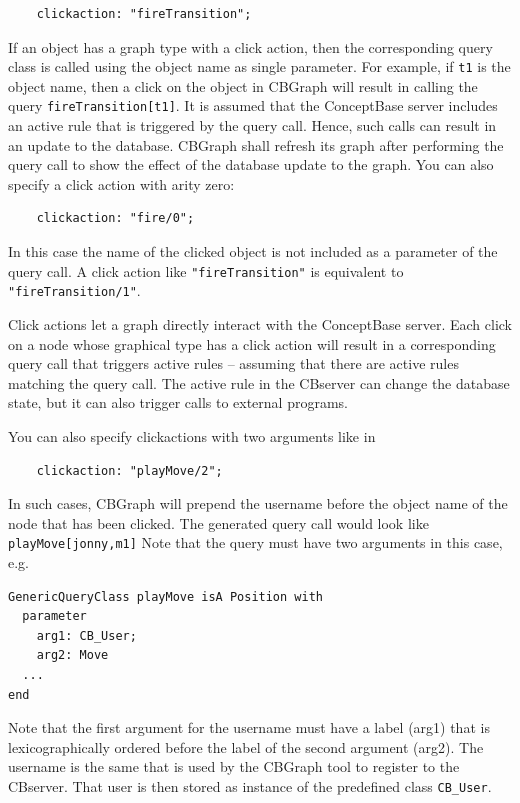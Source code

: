 {\small
\begin{verbatim}
    clickaction: "fireTransition";
\end{verbatim}
}

If an object has a graph type with a click action, then the corresponding query class
is called using the object name as single parameter. For example, if {\tt t1} is the
object name, then a click on the object in CBGraph will result in calling the query
{\tt fireTransition[t1]}. It is assumed that the ConceptBase server includes an
active rule that is triggered by the query call. Hence, such calls can result in an
update to the database.
CBGraph shall refresh its graph after performing the query call to show the effect
of the database update to the graph.
You can also specify a click action with arity zero:

{\small
\begin{verbatim}
    clickaction: "fire/0";
\end{verbatim}
}
In this case the name of the clicked object is not included as a parameter of the query call.
A click action like {\tt "fireTransition"} is equivalent to {\tt "fireTransition/1"}.

Click actions let a graph directly interact with the ConceptBase server. Each click
on a node whose graphical type has a click action will result in a corresponding query
call that triggers active rules -- assuming that there are active rules matching the
query call. The active rule in the CBserver can change the database state, but it
can also trigger calls to external programs.


\vspace{0.3cm}
You can also specify clickactions with two arguments like in
{\small
\begin{verbatim}
    clickaction: "playMove/2";
\end{verbatim}
}

In such cases, CBGraph will prepend the username before the object name of the node
that has been clicked. The generated query call would look like {\tt playMove[jonny,m1]}
Note that the query must have two arguments in this case, e.g.

{\small
\begin{verbatim}
GenericQueryClass playMove isA Position with
  parameter
    arg1: CB_User;
    arg2: Move
  ...
end
\end{verbatim}
}

Note that the first argument for the username must have a label (arg1) that is lexicographically
ordered before the label of the second argument (arg2). The username is the same that is used
by the CBGraph tool to register to the CBserver. That user is then stored as instance of the
predefined class {\tt CB\_User}.


